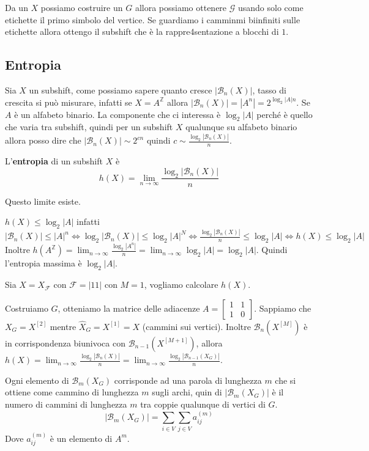 Da un $X$ possiamo costruire un $G$ allora possiamo ottenere $\mathcal{G}$ usando solo
come etichette il primo simbolo del vertice. Se guardiamo i camminmi biinfiniti sulle
etichette allora ottengo il subshift che è la rappre4sentazione a blocchi di $1$.  

\subsection{Entropia}
Sia $X$ un subshift, come possiamo sapere quanto cresce $|\mathcal{B}_n(X)|$, tasso
di crescita si può misurare, infatti se $X=A^\mathbb{Z}$ allora $|\mathcal{B}_n(X)|=|A^n|= 2^{\log_2|A|n}$.
Se $A$ è un alfabeto binario. La componente che ci interessa è $\log_2 |A|$ perché
è quello che varia tra subshift, quindi per un subshift $X$ qualunque su alfabeto binario
allora posso dire che $|\mathcal{B}_n(X)| \sim 2^{cn}$ quindi $c\sim \frac{\log_2|\mathcal{B}_n(X)|}{n}$.

\begin{definizione}
    L'\textbf{entropia} di un subshift $X$ è 
    $$h(X) = \lim_{n\to \infty}\frac{\log_2|\mathcal{B}_n(X)|}{n}$$
\end{definizione}
Questo limite esiste.

\begin{nota}
    $h(X)\le \log_2|A|$ infatti
    $|\mathcal{B}_n(X)| \le |A|^n\iff \log_2 |\mathcal{B}_n(X)| \le \log_2 |A|^N \iff
    \frac{\log_2|\mathcal{B}_n(X)|}{n}\le \log_2|A|\iff h(X)\le \log_2|A|$
    Inoltre $h(A^\mathbb{Z}) = \lim_{n\to \infty}\frac{\log_2|A^n|}{n} =  \lim_{n\to \infty}\log_2|A| = \log_2|A|$.
    Quindi l'entropia massima è $\log_2|A|$.
\end{nota}

\begin{esempio}
    Sia $X=X_\mathcal{F}$ con $\mathcal{F} = |{11}|$ con $M=1$, vogliamo calcolare 
    $h(X)$.

    Costruiamo $G$, otteniamo la matrice delle adiacenze $A=\left[\begin{array}{cc}
        1&1\\
        1&0
    \end{array}\right]$.
    Sappiamo che $X_G = X^{[2]}$ mentre $\hat{X}_G = X^{[1]} =X$ (cammini sui vertici).
    Inoltre $\mathcal{B}_n(X^{[M]})$ è in corrispondenza biunivoca con $\mathcal{B}_{n-1}(X^{[M+1]})$,
    allora $h(X)=\lim_{n\to \infty}\frac{\log_2|\mathcal{B}_n(X)|}{n} = \lim_{n\to \infty}\frac{\log_2|\mathcal{B}_{n-1}(X_G)|}{n}$.
\end{esempio}
Ogni elemento di $\mathcal{B}_{m}(X_G)$ corrisponde ad una parola di lunghezza 
$m$ che si ottiene come cammino di lunghezza $m$ sugli archi, quin di 
$|\mathcal{B}_{m}(X_G)|$ è il numero di cammini di lunghezza $m$ tra coppie qualunque
di vertici di $G$.
$$|\mathcal{B}_{m}(X_G)| = \sum_{i\in V}\sum_{j\in V} a_{ij}^{(m)}$$
Dove $a_{ij}^{(m)}$ è un elemento di $A^m$.

